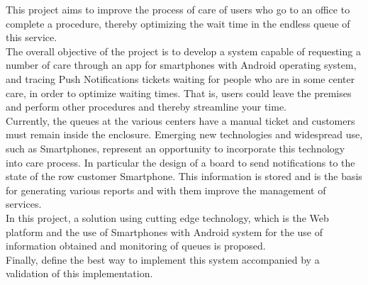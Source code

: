 This project aims to improve the process of care of users who go to an office to complete a procedure, thereby optimizing the wait time in the endless queue of this service. \\

The overall objective of the project is to develop a system capable of requesting a number of care through an app for smartphones with Android operating system, and tracing Push Notifications tickets waiting for people who are in some center care, in order to optimize waiting times. That is, users could leave the premises and perform other procedures and thereby streamline your time. \\

Currently, the queues at the various centers have a manual ticket and customers must remain inside the enclosure. Emerging new technologies and widespread use, such as Smartphones, represent an opportunity to incorporate this technology into care process. In particular the design of a board to send notifications to the state of the row customer Smartphone. This information is stored and is the basis for generating various reports and with them improve the management of services. \\

In this project, a solution using cutting edge technology, which is the Web platform and the use of Smartphones with Android system for the use of information obtained and monitoring of queues is proposed. \\

Finally, define the best way to implement this system accompanied by a validation of this implementation. \\